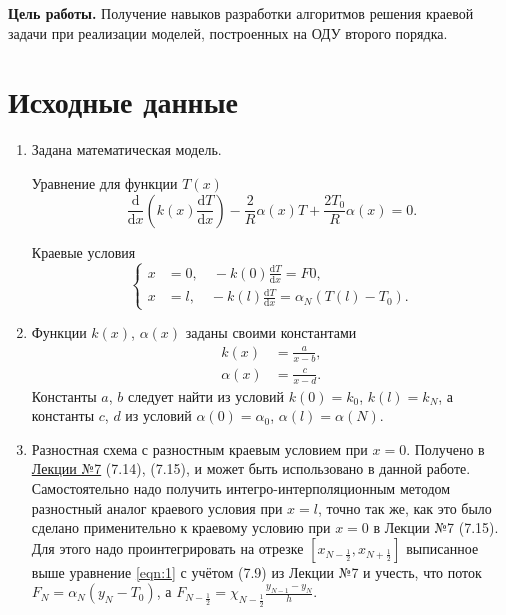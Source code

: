 \documentclass[a4paper,oneside,12pt]{extreport}
\begin{document}


\textbf{Цель работы.} Получение навыков разработки алгоритмов решения краевой задачи при реализации моделей, построенных на ОДУ второго порядка.

\section*{Исходные данные}

\begin{enumerate}
	\item Задана математическая модель.

	Уравнение для функции $T(x)$
	\begin{equation}
		\frac{\mathrm d}{\mathrm dx}\left(k(x)\frac{\mathrm dT}{\mathrm dx}\right)-\frac2R\alpha(x)T+\frac{2T_0}R\alpha(x)=0.
		\label{eqn:1}
	\end{equation}

	Краевые условия
	\begin{equation}
		\left\{
		\begin{aligned}
			x&=0,\quad-k(0)\frac{\mathrm dT}{\mathrm dx}=F0,\\
			x&=l,\quad-k(l)\frac{\mathrm dT}{\mathrm dx}=\alpha_N(T(l)-T_0).
		\end{aligned}
		\right.
	\end{equation}

	\item Функции $k(x)$, $\alpha(x)$ заданы своими константами
	\begin{equation}
		\begin{aligned}
			k(x)&=\frac a{x-b},\\
			\alpha(x)&=\frac c{x-d}.
		\end{aligned}
	\end{equation}
	Константы $a$, $b$ следует найти из условий $k(0)=k_0$, $k(l)=k_N$, а константы $c$, $d$ из условий $\alpha(0)=\alpha_0$, $\alpha(l)=\alpha(N)$.

	\item Разностная схема с разностным краевым условием при $x=0$.
	Получено в \href{ftp://eufs.bmstu.ru/19426610-bd1a-11e6-93f1-005056960017/26-03-2020-%D0%9B%D0%B5%D0%BA%D1%86%D0%B8%D1%8F_%E2%84%967_%D0%9C%D0%BE%D0%B4%D0%B5%D0%BB%D0%B8_%D0%9E%D0%94%D0%A3_%D0%BA%D1%80%D0%B0%D0%B5%D0%B2%D0%B0%D1%8F_%D0%B7%D0%B0%D0%B4%D0%B0%D1%87%D0%B0.pdf}{Лекции №7} (7.14), (7.15), и может быть использовано в данной работе.
	Самостоятельно надо получить интегро-интерполяционным методом разностный аналог краевого условия при $x=l$, точно так же, как это было сделано применительно к краевому условию при $x=0$ в Лекции №7 (7.15).
	Для этого надо проинтегрировать на отрезке $[x_{N-\frac12}, x_{N+\frac12}]$ выписанное выше уравнение \eqref{eqn:1} с учётом (7.9) из Лекции №7 и учесть, что поток $F_N=\alpha_N(y_N-T_0)$, а $\displaystyle F_{N-\frac12}=\chi_{N-\frac12}\frac{y_{N-1}-y_N}h$.


\end{enumerate}
\end{document}
